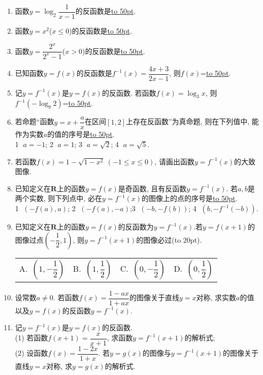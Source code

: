 \documentclass[10pt,a4paper]{article}
\newcommand{\blank}[1]{\underline{\hbox to #1pt{}}}
\newcommand{\bracket}[1]{(\hbox to #1pt{})}
\newcommand{\fourch}[4]{\par\begin{tabular}{p{.23\textwidth}p{.23\textwidth}p{.23\textwidth}p{.23\textwidth}}
A.~#1 &B.~#2& C.~#3& D.~#4
\end{tabular}}
\begin{document}
\begin{enumerate}[1.]
\item 函数$y=\log_2 \dfrac 1{x-1}$的反函数是\blank{50}.
\item 函数$y=x^2$($x\le 0$)的反函数是\blank{50}.
\item 函数$y=\dfrac{2^x}{{2^x}-1}$($x>0$)的反函数是\blank{50}.
\item 已知函数$y=f(x)$的反函数是$f^{-1}(x)=\dfrac{4x+3}{2x-1}$, 则$f(x)$=\blank{50}.
\item 记$y=f^{-1}(x)$是$y=f(x)$的反函数. 若函数$f(x)=\log_3x$, 则$f^{-1}(-\log_9 2)$=\blank{50}.
\item 若命题``函数$y=x+\dfrac ax$在区间$[1,2]$上存在反函数''为真命题, 则在下列值中, 能作为实数$a$的值的序号是\blank{50}.\\
\textcircled{1} $a=-1$; \textcircled{2} $a=1$; \textcircled{3} $a=\sqrt 2$; \textcircled{4} $a=\sqrt 5$.
\item 若函数$f(x)=1-\sqrt{1-x^2}\ (-1\le x\le 0)$,
请画出函数$y={f^{-1}}(x)$的大致图像.
\begin{center}
\end{center}
\item 已知定义在$\mathbf{R}$上的函数$y=f(x)$是奇函数, 且有反函数$y=f^{-1}(x)$. 若$a,b$是两个实数, 则下列点中, 必在$y=f^{-1}(x)$的图像上的点的序号是\blank{50}.\\
\textcircled{1} $(-f(a),a)$; \textcircled{2} $(-f(a),-a)$;\textcircled{3} $(-b,-f(b))$; \textcircled{4} $(b,-f^{-1}(-b))$.
\item 已知定义在$\mathbf{R}$上的函数$y=f(x)$的反函数为$y=f^{-1}(x)$.若$y=f(x+1)$的图像过点$(-\dfrac 12,1)$, 则$y=f^{-1}(x+1)$的图像必过\bracket{20}.
\fourch{$(1,-\dfrac 12)$}{$(1,\dfrac 12)$}{$(0,-\dfrac 12)$}{$(0,\dfrac 12)$}
\item 设常数$a\ne 0$. 若函数$f(x)=\dfrac{1-ax}{1+ax}$的图像关于直线$y=x$对称, 求实数$a$的值以及$y=f(x)$的反函数$y=f^{-1}(x)$.
\item 记$y=f^{-1}(x)$是$y=f(x)$的反函数.\\
(1) 若函数$f(x+1)=\dfrac x{x+1}$, 求函数$y=f^{-1}(x+1)$的解析式;\\
(2) 设函数$f(x)=\dfrac{1-2x}{1+x}$. 若$y=g(x)$的图像与$y=f^{-1}(x+1)$的图像关于直线$y=x$对称, 求$y=g(x)$的解析式.

\end{enumerate}
\end{document}
